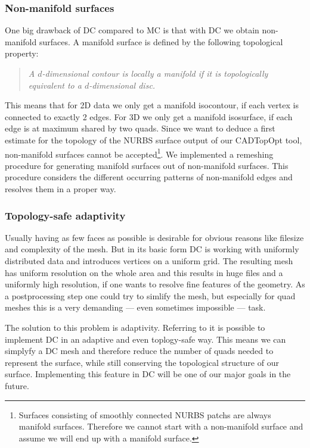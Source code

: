 \subsubsection{Non-manifold surfaces}
One big drawback of \ac{DC} compared to \ac{MC} is that with \ac{DC} we obtain non-manifold surfaces. A manifold surface is defined by the following topological property:
\begin{quote}
\emph{A $d$-dimensional contour is locally a \emph{manifold} if it is topologically equivalent to a $d$-dimensional disc.}\cite{Hermite2002}
\end{quote}
This means that for 2D data we only get a manifold isocontour, if each vertex is connected to exactly 2 edges. For 3D we only get a manifold isosurface, if each edge is at maximum shared by two \acp{quad}. 
Since we want to deduce a first estimate for the topology of the \ac{NURBS} surface output of our \ac{CADTopOpt} tool, non-manifold surfaces cannot be accepted\footnote{Surfaces consisting of smoothly connected \ac{NURBS} \acp{patch} are always manifold surfaces. Therefore we cannot start with a non-manifold surface and assume we will end up with a manifold surface.}. We implemented a remeshing procedure for generating manifold surfaces out of non-manifold surfaces. This procedure considers the different occurring patterns of non-manifold edges and resolves them in a proper way. 

\subsubsection{Topology-safe adaptivity}
Usually having as few faces as possible is desirable for obvious reasons like filesize and complexity of the mesh. But in its basic form \ac{DC} is working with uniformly distributed data and introduces vertices on a uniform grid. The resulting mesh has uniform resolution on the whole area and this results in huge files and a uniformly high resolution, if one wants to resolve fine features of the geometry. As a postprocessing step one could try to simlify the mesh, but especially for \ac{quad} meshes this is a very demanding --- even sometimes impossible --- task.

The solution to this problem is adaptivity. Referring to \cite{Hermite2002} it is possible to implement \ac{DC} in an adaptive and even toplogy-safe way. This means we can simplyfy a \ac{DC} mesh and therefore reduce the number of \acp{quad} needed to represent the surface, while still conserving the topological structure of our surface. Implementing this feature in \ac{DC} will be one of our major goals in the future.

